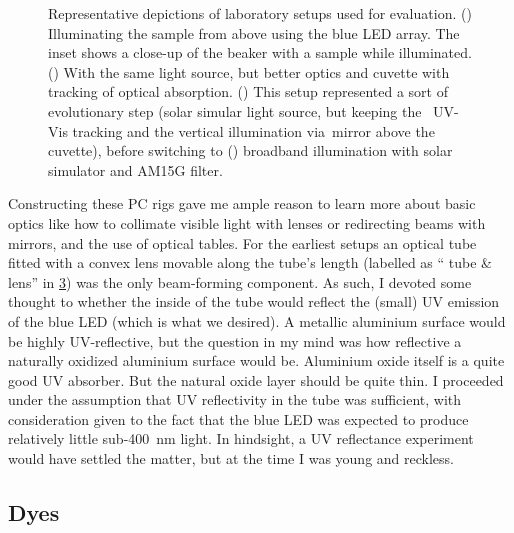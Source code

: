 \documentclass[draft,webedition,openright,titles,swedish,english]{LuaUUThesis}\usepackage[]{graphicx}\usepackage[]{xcolor}
\newcommand{\via}{via}
\begin{document}
\begin{figure}[tbp]
\begin{subfigure}[T]{0.32\textwidth}
\begin{subfigure}{\linewidth}
      \label{fig:0400-pc-solarsimulator-suspension}
   \end{subfigure}%
\end{subfigure}%
\caption[Evolution of PC setups]{%
   Representative depictions of laboratory setups used for  evaluation.
   ()
   Illuminating the sample from above using the blue \gls{LED} array.
   The inset shows a close-up of the beaker with a sample while illuminated.
   ()
   With the same light source, but better optics and cuvette with \insitu{} tracking
   of optical absorption.
   ()
   This setup represented a sort of evolutionary step (solar simular light source,
   but keeping the \insitu\  \gls{UV-Vis} tracking and the vertical illumination
   \via\ mirror above the cuvette), before switching to
   ()
   broadband illumination with solar simulator and \gls{AM15G} filter.
}
\label{fig:0400-pc-rigs}
\end{figure}

Constructing these \gls{PC} rigs gave me ample reason to learn more
about basic optics like how to collimate visible light with lenses
or redirecting beams with mirrors, and the use of optical tables.
For the earliest setups an optical tube fitted with a convex lens
movable along the tube's length
(labelled as \enquote{ tube \& lens} in \cref{fig:0400-pc-rigs})
was the only beam-forming component. As such, I devoted some thought to
whether the inside of the tube would reflect the (small) UV emission of the
blue \gls{LED} (which is what we desired).
A metallic aluminium surface would be highly UV-reflective, but the question
in my mind was how reflective a naturally oxidized aluminium surface would be.
Aluminium oxide itself is a quite good \gls{UV} absorber. But the natural oxide layer
should be quite thin.
I proceeded under the assumption that UV reflectivity in the tube was sufficient,
with consideration given to the fact that the blue \gls{LED} was expected to
produce relatively little sub-\qty{400}{\nm} light.
In hindsight, a \gls{UV} reflectance experiment would have settled the matter,
but at the time I was young and reckless.



\subsection{Dyes}
\label{pc:dyes}
\end{document}
